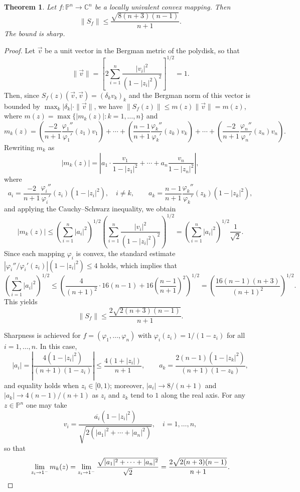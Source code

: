 \documentclass[12pt]{amsart}
\newtheorem{theorem}{Theorem}[section]
\theoremstyle{definition}
\theoremstyle{remark}
\numberwithin{equation}{section}
\begin{document}
\begin{theorem}
Let $f:\mathbb{P}^n\to\mathbb{C}^n$ be a locally univalent convex mapping.
Then
\[
\|S_f\|\leq \frac{\sqrt{8(n+3)(n-1)}}{n+1}.
\]
The bound is sharp.
\end{theorem}

\begin{proof}
Let $\vec{v}$ be a unit vector in the Bergman metric of the polydisk, so that
\[
\|\vec{v}\|=\left[2\sum_{i=1}^n\frac{|v_i|^2}{(1-|z_i|^2)^2}\right]^{1/2}=1.
\]
Then, since $S_f(z)(\vec{v},\vec{v})=(\delta_k v_k)_k$ and the Bergman norm
of this vector is bounded by $\max_k|\delta_k|\cdot\|\vec{v}\|$, we have
$\|S_f(z)\|\leq m(z)\|\vec{v}\|=m(z)$, where
$m(z)=\max\{|m_k(z)|:k=1,\ldots,n\}$ and
\[
m_k(z) =\left(\frac{-2}{n+1}\frac{\varphi_1''}{\varphi_1'}(z_1)v_1
\right)
+\cdots+\left(\frac{n-1}{n+1}\frac{\varphi_k''}{\varphi_k'}(z_k)v_k
\right)
+\cdots+\left(\frac{-2}{n+1}\frac{\varphi_n''}{\varphi_n'}(z_n)v_n
\right).
\]
Rewriting $m_k$ as
\[
|m_k(z)|=
\left|a_1\cdot\frac{v_1}{1-|z_1|^2}+\cdots+a_n\frac{v_n}{1-|z_n|^2}\right|,
\]
where
\[
a_i=\frac{-2}{n+1}\frac{\varphi_i''}{\varphi_i'}(z_i)(1-|z_i|^2),
\quad i\neq k,
\qquad
a_k=\frac{n-1}{n+1}\frac{\varphi_k''}{\varphi_k'}(z_k)(1-|z_k|^2),
\]
and applying the Cauchy--Schwarz inequality, we obtain
\[
|m_k(z)| \leq
\left(\sum_{i=1}^{n}|a_i|^2\right)^{1/2}
\left(\sum_{i=1}^{n}\frac{|v_i|^2}{(1-|z_i|^2)^2}\right)^{1/2}
=\left(\sum_{i=1}^{n}|a_i|^2\right)^{1/2}\frac{1}{\sqrt{2}}.
\]
Since each mapping $\varphi_i$ is convex, the standard estimate
$|\varphi_i''/\varphi_i'(z_i)|(1-|z_i|^2)\leq 4$ holds, which implies that
\[
\left(\sum_{i=1}^{n}|a_i|^2\right)^{1/2}
\leq
\left(\frac{4}{(n+1)^2}\cdot16(n-1)+16\left(\frac{n-1}{n+1}\right)^2\right)^{1/2}
=\left(\frac{16(n-1)(n+3)}{(n+1)^2}\right)^{1/2}.
\]
This yields
\[
\|S_f\|\leq \frac{2\sqrt{2(n+3)(n-1)}}{n+1}.
\]

Sharpness is achieved for $f=(\varphi_1,\ldots,\varphi_n)$ with
$\varphi_i(z_i)=1/(1-z_i)$ for all $i=1,\ldots,n$. In this case,
\[
|a_i|=\left|\frac{4(1-|z_i|^2)}{(n+1)(1-z_i)}\right|\leq \frac{4(1+|z_i|)}{n+1},
\qquad
a_k=\frac{2(n-1)(1-|z_k|^2)}{(n+1)(1-z_k)},
\]
and equality holds when $z_i\in[0,1)$; moreover, $|a_i|\to 8/(n+1)$ and
$|a_k|\to 4(n-1)/(n+1)$ as $z_i$ and $z_k$ tend to $1$ along the real axis.
For any $z\in\mathbb{P}^n$ one may take
\[
v_i=\frac{\overline{a_i}(1-|z_i|^2)}{\sqrt{2(|a_1|^2+\cdots+|a_n|^2)}},
\quad i=1,\ldots,n,
\]
so that
\[
\lim_{z_i\to 1^-}m_k(z)
=\lim_{z_i\to 1^-}\frac{\sqrt{|a_1|^2+\cdots+|a_n|^2}}{\sqrt{2}}
= \frac{2\sqrt{2(n+3)(n-1)}}{n+1}. \qedhere
\]
\end{proof}
\end{document}
